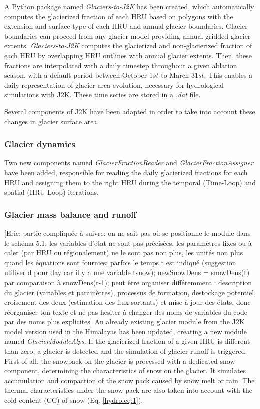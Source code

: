 A Python package named \textit{Glaciers-to-J2K} has been created, which automatically computes the glacierized fraction of each HRU based on polygons with the extension and surface type of each HRU and annual glacier boundaries. Glacier boundaries can proceed from any glacier model providing annual gridded glacier extents. \textit{Glaciers-to-J2K} computes the glacierized and non-glacierized fraction of each HRU by overlapping HRU outlines with annual glacier extents. Then, these fractions are interpolated with a daily timestep throughout a given ablation season, with a default period between October 1${st}$ to March 31${st}$. This enables a daily representation of glacier area evolution, necessary for hydrological simulations with J2K. These time series are stored in a \textit{.dat} file.

Several components of J2K have been adapted in order to take into account these changes in glacier surface area. 

\subsubsection{Glacier dynamics}

Two new components named \textit{GlacierFractionReader} and \textit{GlacierFractionAssigner} have been added, responsible for reading the daily glacierized fractions for each HRU and assigning them to the right HRU during the temporal (Time-Loop) and spatial (HRU-Loop) iterations. 

\subsubsection{Glacier mass balance and runoff}

[Eric: partie compliquée à suivre: on ne sait pas où se positionne le module dans le schéma 5.1; les variables d'état ne sont pas précisées, les paramètres fixes ou à caler (par HRU ou régionalement) ne le sont pas non plus, les unités non plus quand les équations sont fournies; parfois le temps t est indiqué (suggestion utiliser d pour day car il y a une variable tsnow); newSnowDens = snowDens(t) par comparaison à snowDens(t-1); peut être organiser différemment : description du glacier (variables et paramètres), processus de formation, destockage potentiel, croisement des deux (estimation des flux sortants) et mise à jour des états, donc réorganiser ton texte et ne pas hésiter à changer des noms de variables du code par des noms plus explicites] An already existing glacier module from the J2K model version used in the Himalayas has been updated, creating a new module named \textit{GlacierModuleAlps}. If the glacierized fraction of a given HRU is different than zero, a glacier is detected and the simulation of glacier runoff is triggered. First of all, the snowpack on the glacier is processed with a dedicated snow component, determining the characteristics of snow on the glacier. It simulates accumulation and compaction of the snow pack caused by snow melt or rain. The thermal characteristics under the snow pack are also taken into account with the cold content (CC) of snow (Eq. \ref{hydro:eq:1}).

